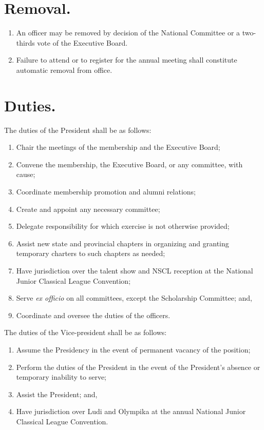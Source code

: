 \documentclass{bylaws}
\newcommand{\NSCL}{\textsc{NSCL}\xspace}
\begin{document}
\begin{linenumbers}[1]
  \section{Removal.}
  \begin{enumerate}
  \item An officer may be removed by decision of the National Committee
    or a two-thirds vote of the Executive Board.
  \item Failure to attend or to register for the annual meeting shall
    constitute automatic removal from office.\\
  \end{enumerate}

  \section{Duties.} %
  \begin{enumerate}
    \sub[President] The duties of the President shall be as follows:
    \begin{enumerate}
    \item Chair the meetings of the membership and the Executive Board;
    \item Convene the membership, the Executive Board, or any committee,
      with cause;
    \item Coordinate membership promotion and alumni relations;
    \item Create and appoint any necessary committee;
    \item Delegate responsibility for which exercise is not otherwise
      provided;
    \item Assist new state and provincial chapters in organizing and
      granting temporary charters to such chapters as needed;
    \item Have jurisdiction over the talent show and \NSCL reception at
      the National Junior Classical League Convention;
    \item Serve \textit{ex officio} on all committees, except the
      Scholarship Committee; and,
    \item Coordinate and oversee the duties of the officers.
    \end{enumerate}
    
     The duties of the Vice-president shall be as
    follows:
    \begin{enumerate}
    \item Assume the Presidency in the event of permanent vacancy of the
      position;
    \item Perform the duties of the President in the event of the
      President's absence or temporary inability to serve;
    \item Assist the President; and,
    \item Have jurisdiction over Ludi and Olympika at the annual
      National Junior Classical League Convention.
    \end{enumerate}
    

\end{enumerate}
\end{linenumbers}
\end{document}
